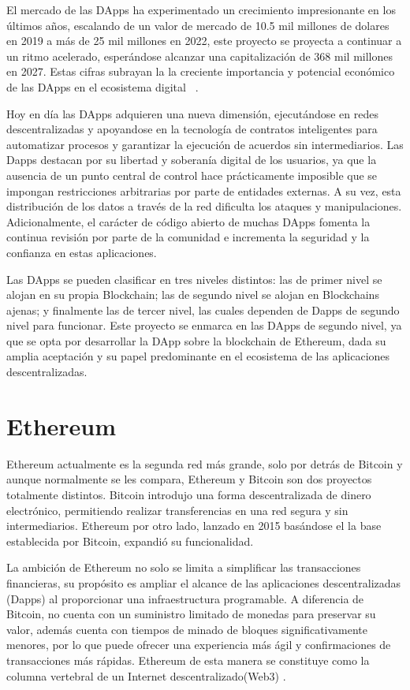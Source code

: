 
El mercado de las DApps ha experimentado un crecimiento impresionante en los últimos años, escalando de un valor de mercado de 10.5 mil millones de dolares en 2019 a más de 25 mil millones en 2022, este proyecto se proyecta a continuar a un ritmo acelerado, esperándose alcanzar una capitalización de 368 mil millones en 2027. Estas cifras subrayan la la creciente importancia y potencial económico de las DApps en el ecosistema digital ~\cite{DAppsEconomía}.

Hoy en día las DApps adquieren una nueva dimensión, ejecutándose en redes descentralizadas y apoyandose en la tecnología de contratos inteligentes para automatizar procesos y garantizar la ejecución de acuerdos sin intermediarios.
Las Dapps destacan por su libertad y soberanía digital de los usuarios, ya que la ausencia de un punto central de control hace prácticamente imposible que se impongan restricciones arbitrarias por parte de entidades externas. A su vez, esta distribución de los datos a través de la red dificulta los ataques y manipulaciones.
Adicionalmente, el carácter de código abierto de muchas DApps fomenta la continua revisión por parte de la comunidad e incrementa la seguridad y la confianza en estas aplicaciones.

Las DApps se pueden clasificar en tres niveles distintos: las de primer nivel se alojan en su propia Blockchain; las de segundo nivel se alojan en Blockchains ajenas; y finalmente las de tercer nivel, las cuales dependen de Dapps de segundo nivel para funcionar.
Este proyecto se enmarca en las DApps de segundo nivel, ya que se opta por desarrollar la DApp sobre la blockchain de Ethereum, dada su amplia aceptación y su papel predominante en el ecosistema de las aplicaciones descentralizadas.


\section{Ethereum}

Ethereum actualmente es la segunda red más grande, solo por detrás de Bitcoin y aunque normalmente se les compara, Ethereum y Bitcoin son dos proyectos totalmente distintos.
Bitcoin introdujo una forma descentralizada de dinero electrónico, permitiendo realizar transferencias en una red segura y sin intermediarios.
Ethereum por otro lado, lanzado en 2015 basándose el la base establecida por Bitcoin, expandió su funcionalidad.

La ambición de Ethereum no solo se limita a simplificar las transacciones financieras, su propósito es ampliar el alcance de las aplicaciones descentralizadas (Dapps) al proporcionar una infraestructura programable.
A diferencia de Bitcoin, no cuenta con un suministro limitado de monedas para preservar su valor, además cuenta con tiempos de minado de bloques significativamente menores, por lo que puede ofrecer una experiencia más ágil y confirmaciones de transacciones más rápidas.
Ethereum de esta manera se constituye como la columna vertebral de un Internet descentralizado(Web3) \cite{QueEsEthereum}.


